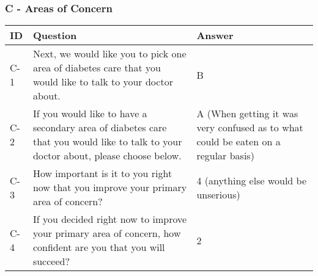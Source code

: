 \subsubsection{C - Areas of Concern}
\begin{table}[H]
    \centering
    \renewcommand{\arraystretch}{1.2}
    \begin{tabularx}{\textwidth}{|l|X|l|}
        \hline
        \textbf{ID} & \textbf{Question} & \textbf{Answer} \\ \hline
        C-1 & Next, we would like you to pick one area of diabetes care that you would like to talk to your doctor about. & 
        B
        \\ \hline
        C-2 & If you would like to have a secondary area of diabetes care that you would like to talk to your doctor about, please choose below. &  
        A (When getting it was very confused as to what could be eaten on a regular basis) 
        \\ \hline
        C-3 & How important is it to you right now that you improve your primary area of concern? & 
        4 (anything else would be unserious)  
        \\ \hline
        C-4 & If you decided right now to improve your primary area of concern, how confident are you that you will succeed? & 
        2  
        \\ \hline
    \end{tabularx}
\end{table}

